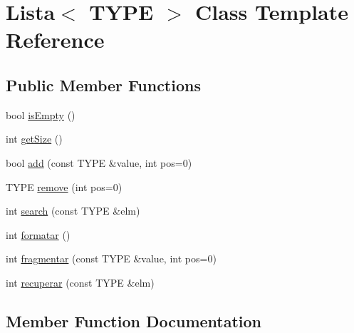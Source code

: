 \hypertarget{classLista}{}\section{Lista$<$ T\+Y\+P\+E $>$ Class Template Reference}
\label{classLista}
\subsection*{Public Member Functions}
\begin{DoxyCompactItemize}
\item 
bool \hyperlink{classLista_a1f5401b4cff0910a13da7190f08e6e29}{is\+Empty} ()
\item 
int \hyperlink{classLista_a7d72cde343c869a5a6c6acc442413498}{get\+Size} ()
\item 
bool \hyperlink{classLista_a335dd24f64befa4f6e647c5454def9cd}{add} (const T\+Y\+P\+E \&value, int pos=0)
\item 
T\+Y\+P\+E \hyperlink{classLista_acfa3991b3fb91d3c4c1df5eb02e583ac}{remove} (int pos=0)
\item 
int \hyperlink{classLista_aa876dc91fdc196b50d8e12b2887fee0a}{search} (const T\+Y\+P\+E \&elm)
\item 
int \hyperlink{classLista_aad7434887449f736b322071315ec64cd}{formatar} ()
\item 
int \hyperlink{classLista_aba5184a091be36897e32075b18abcb40}{fragmentar} (const T\+Y\+P\+E \&value, int pos=0)
\item 
int \hyperlink{classLista_a0cbeced4e444c69562262fcb1e1ab49c}{recuperar} (const T\+Y\+P\+E \&elm)
\end{DoxyCompactItemize}


\subsection{Member Function Documentation}
\hypertarget{classLista_a335dd24f64befa4f6e647c5454def9cd}{}
